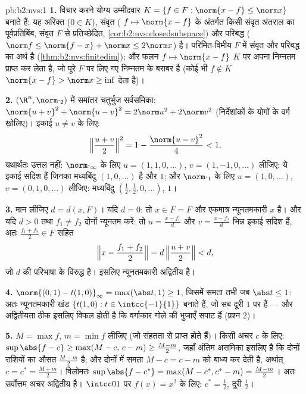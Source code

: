 \begin{solution}{pb:b2:nvs:1}
\textbf{1.} विचार करने योग्य उम्मीदवार $K = \{f \in F
: \norm{x - f} \leq \norm x\}$ बनाते हैं: यह अरिक्त ($0 \in K$),
संवृत ( $f \mapsto
\norm{x - f}$ के अंतर्गत किसी संवृत अंतराल का पूर्वप्रतिबिंब, संवृत
$F$ से प्रतिच्छेदित, \cref{cor:b2:nvs:closedsubspace}) और परिबद्ध ($\norm f \leq
\norm{f - x} + \norm x \leq 2\norm x$) है। परिमित-विमीय $F$ में
संवृत और परिबद्ध का अर्थ  है (\cref{thm:b2:nvs:finitedim}); और  फलन $f
\mapsto \norm{x - f}$ $K$ पर अपना
निम्नतम प्राप्त कर लेता है, जो पूरे $F$ पर लिए गए निम्नतम के बराबर है
(कोई भी $f \notin K$ $\norm{x -
f} > \norm x \geq \inf$ देता है)।

\textbf{2.} $(\R^n,
\norm\cdot_2)$ में समांतर चतुर्भुज सर्वसमिका: $\norm{u + v}^2 + \norm{u - v}^2 = 2\norm u^2 +
2\norm v^2$ (निर्देशांकों के
योगों के वर्ग खोलिए)। इकाई $u \neq v$ के लिए:
\[
\Bigl\Vert\frac{u+v}2\Bigr\Vert^2 = 1 - \frac{\norm{u -
v}^2}{4} < 1 .
\]
यथार्थतः उत्तल नहीं: $\norm\cdot_\infty$ के लिए $u = (1, 1, 0,
\dots)$, $v = (1, -1, 0, \dots)$ लीजिए: ये इकाई सदिश हैं जिनका
मध्यबिंदु $(1, 0, \dots)$ है और  $1$; और $\norm\cdot_1$ के लिए $u = (1,
0, \dots)$, $v = (0, 1, 0, \dots)$ लीजिए:
मध्यबिंदु $(\frac12,
\frac12, 0, \dots)$,  $1$।

\textbf{3.} मान लीजिए $d = d(x, F)$। यदि $d = 0$: तो $x \in \overline F =
F$ और एकमात्र न्यूनतमकारी $x$
है। और यदि $d > 0$ तथा $f_1 \neq f_2$ दोनों न्यूनतम करें: तो $u = \frac{x - f_1}{d}$ और $v = \frac{x -
f_2}{d}$ भिन्न इकाई
सदिश हैं, अतः $\frac{f_1 + f_2}2 \in F$ सहित
\[
\Bigl\Vert x - \frac{f_1 + f_2}2\Bigr\Vert
= d\,\Bigl\Vert\frac{u + v}2\Bigr\Vert < d ,
\]
जो $d$ की परिभाषा के विरुद्ध है। इसलिए न्यूनतमकारी अद्वितीय है।

\textbf{4.} $\norm{(0,1) - t(1,0)}_\infty = \max(\abs t, 1)
\geq 1$, जिसमें समता तभी जब $\abs t \leq 1$: अतः न्यूनतमकारी खंड $\{t(1, 0) : t \in \intcc{-1}{1}\}$ बनाते
हैं, जो सब दूरी $1$ पर हैं --- और अद्वितीयता ठीक इसलिए विफल होती है कि
वर्गाकार गोले की भुजाएँ सपाट हैं (प्रश्न 2)।

\textbf{5.} $M = \max f$, $m = \min f$ लीजिए (जो संहतता से प्राप्त होते हैं)। किसी अचर
$c$ के लिए: $\sup\abs{f - c} \geq
\max(M - c,\, c - m) \geq \frac{M - m}2$, जहाँ अंतिम असमिका इसलिए है कि दोनों राशियों का औसत $\frac{M-m}2$
है; और दोनों में समता $M - c = c - m$ को बाध्य कर देती है, अर्थात् $c = c^* = \frac{M + m}2$। विलोमतः
$\sup\abs{f - c^*} = \max(M - c^*, c^* - m) =
\frac{M - m}2$। अतः सर्वोत्तम अचर अद्वितीय है। $\intcc01$ पर $f(x) = x^2$ के लिए: $c^* = \frac12$, दूरी $\frac12$।


\end{solution}
